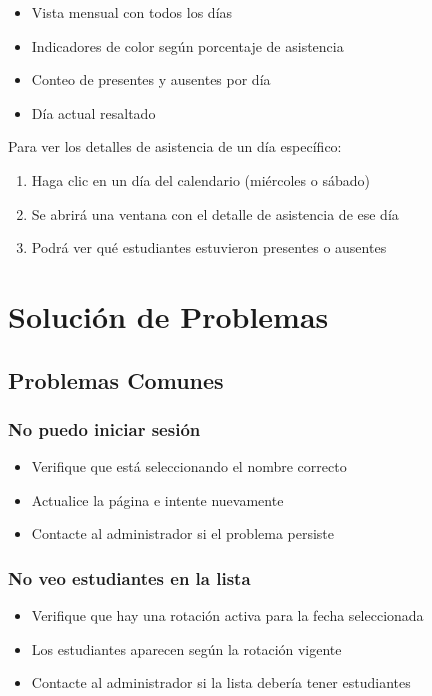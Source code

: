 \documentclass[11pt,a4paper]{article}
\begin{document}
\begin{itemize}
  \item Vista mensual con todos los días
  \item Indicadores de color según porcentaje de asistencia
  \item Conteo de presentes y ausentes por día
  \item Día actual resaltado
\end{itemize}

Para ver los detalles de asistencia de un día específico:
\begin{enumerate}
  \item Haga clic en un día del calendario (miércoles o sábado)
  \item Se abrirá una ventana con el detalle de asistencia de ese día
  \item Podrá ver qué estudiantes estuvieron presentes o ausentes
\end{enumerate}

\section{Solución de Problemas}

\subsection{Problemas Comunes}

\subsubsection{No puedo iniciar sesión}
\begin{itemize}
  \item Verifique que está seleccionando el nombre correcto
  \item Actualice la página e intente nuevamente
  \item Contacte al administrador si el problema persiste
\end{itemize}

\subsubsection{No veo estudiantes en la lista}
\begin{itemize}
  \item Verifique que hay una rotación activa para la fecha seleccionada
  \item Los estudiantes aparecen según la rotación vigente
  \item Contacte al administrador si la lista debería tener estudiantes
\end{itemize}
\end{document}
